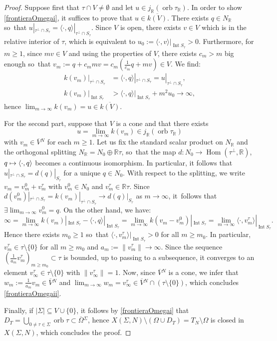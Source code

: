 \documentclass[JEP,XML,SOM,Unicode,NoFloatCountersInSection]{cedram}
\theoremstyle{definition}
\newcommand\mto{\mathchoice{\longmapsto}{\mapsto}{\mapsto}{\mapsto}}
\let\ov\overline
\let\sminus\setminus
\newcommand{\RR}{\mathbb{R}}
\DeclareMathOperator{\Hom}{Hom}
\DeclareMathOperator{\Int}{Int}
\DeclareMathOperator{\orb}{orb}
\begin{document}
\begin{proof}
Suppose first that $\tau\cap V\neq\emptyset$ and let $u\in j_{\RR}(\orb\tau_\RR)$. In order to show \eqref{frontieraOmegai}, it suffices to prove that $u\in\ov{k(V)}$. There exists $q\in N_\RR$ so~that $u|_{\tau^\perp\cap S_\tau}=\langle\cdot, q\rangle|_{\tau^\perp\cap S_\tau}$. Since $V$ is open, there exists $v\in V$ which is in the relative interior of $\tau$, which is equivalent to $u_0:=\langle\cdot, v\rangle|_{\Int S_\tau}>0$. Furthermore, for $m\geq 1$, since $mv\in V$ and using the properties of $V$, there exists $c_m>m$ big enough so~that \hbox{$v_m:=q+c_mmv=c_m(\frac{1}{c_m}q+mv)\in V$}. We find:\vspace*{-3pt}
\begin{align*}
k(v_m)|_{\tau^\perp\cap S_\tau}&=\langle\cdot,q\rangle|_{\tau^\perp\cap S_\tau}=u|_{\tau^\perp\cap S_\tau},\\
k(v_m)|_{\Int S_\tau}&>\langle \cdot, q\rangle|_{\Int S_\tau}+m^2u_0\to\infty,
\end{align*}
hence $\lim_{m\to\infty}k(v_m)=u\in\ov{k(V)}$.

For the second part, suppose that $V$ is a cone and that there exists
\[
u=\lim_{m\to\infty}k(v_m)\in j_\RR(\orb\tau_\RR)
\]
with $v_m\in\ov V{}^N$ for each $m\geq 1$. Let us fix the standard scalar product on $N_\RR$ and the orthogonal splitting $N_\RR=N_0\oplus \RR \tau$, so~that the map $d:N_0\to\Hom(\tau^\perp,\RR)$, $q\mto\langle\cdot,q\rangle$ becomes a continuous isomorphism. In particular, it follows that $u|_{\tau^\perp\cap S_\tau}=d(q)|_{S_\tau}$ for a unique $q\in N_0$. With respect to the splitting, we write $v_m=v_m^0+v_m^\tau$ with $v_m^0\in N_0$ and $v_m^\tau\in\RR\tau$. Since $d(v_m^0)|_{\tau^\perp\cap S_\tau}=k(v_m)|_{\tau^\perp\cap S_\tau}\to d(q)|_{S_\tau}$ as $m\to\infty$, it~follows that $\exists\lim_{m\to\infty}v_m^0=q$. On the other hand, we have:
\begin{equation*}
\infty=\lim_{m\to\infty}k(v_m)|_{\Int S_\tau}-\langle\cdot,q\rangle|_{\Int S_\tau}=\lim_{m\to\infty}k(v_m-v_m^0)|_{\Int S_\tau}=\lim_{m\to\infty}\langle\cdot,v_m^\tau\rangle|_{\Int S_\tau}.
\end{equation*}
Hence there exists $m_0\geq 1$ so~that $\langle\cdot,v_m^\tau\rangle|_{\Int S_\tau}>0$ for all $m\geq m_0$. In particular, $v_m^\tau\in\tau\sminus\{0\}$ for all $m\geq m_0$ and $a_m:=\|v_m^\tau\|\to \infty$. Since the sequence $(\frac{1}{a_m}v_m^\tau)_{m\geq m_0}\subset \tau$ is bounded, up to passing to a subsequence, it converges to an element $v_\infty^\tau\in\tau\sminus\{0\}$ with $\|v_\infty^\tau\|=1$. Now, since $\ov{V}{}^N$ is a cone, we infer that $w_m:=\frac{1}{a_m}v_m\in \ov V{}^N$ and $\lim_{m\to\infty}w_m=v_\infty^\tau\in\ov V{}^N\cap(\tau\sminus\{0\})$, which concludes \eqref{frontieraOmegaii}.

Finally, if $|\Sigma|\subseteq V\cup\{0\}$, it follows by \eqref{frontieraOmegai} that $D_T=\bigcup_{0\neq\tau\in\Sigma}\orb\tau\subset\ov\Omega{}^\Sigma$, hence $X(\Sigma,N)\sminus(\Omega\cup D_T)=T_N\sminus\Omega$ is closed in $X(\Sigma,N)$, which concludes the proof.
\end{proof}
\end{document}
